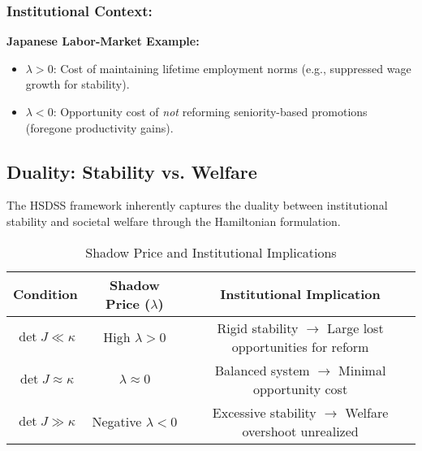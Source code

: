 \documentclass[10pt]{article}
\theoremstyle{definition}
\begin{document}
\subsubsection{Institutional Context:}

\textbf{Japanese Labor-Market Example:}

\begin{itemize}
    \item $\lambda > 0$: Cost of maintaining lifetime employment norms (e.g., suppressed wage growth for stability).
    \item $\lambda < 0$: Opportunity cost of \textit{not} reforming seniority-based promotions (foregone productivity gains).
\end{itemize}

\subsection{Duality: Stability vs. Welfare}

The HSDSS framework inherently captures the duality between institutional stability and societal welfare through the Hamiltonian formulation.
\begin{table}[htbp]
\centering
\caption{Shadow Price and Institutional Implications}
\begin{tabular}{ccc}
\hline
Condition & Shadow Price ($\lambda$) & Institutional Implication \\
\hline
$\det J \ll \kappa$ & High $\lambda > 0$ & Rigid stability $\rightarrow$ Large lost opportunities for reform \\
$\det J \approx \kappa$ & $\lambda \approx 0$ & Balanced system $\rightarrow$ Minimal opportunity cost \\
$\det J \gg \kappa$ & Negative $\lambda < 0$ & Excessive stability $\rightarrow$ Welfare overshoot unrealized \\
\hline
\end{tabular}
\label{tab:shadow_price}
\end{table}
\end{document}
